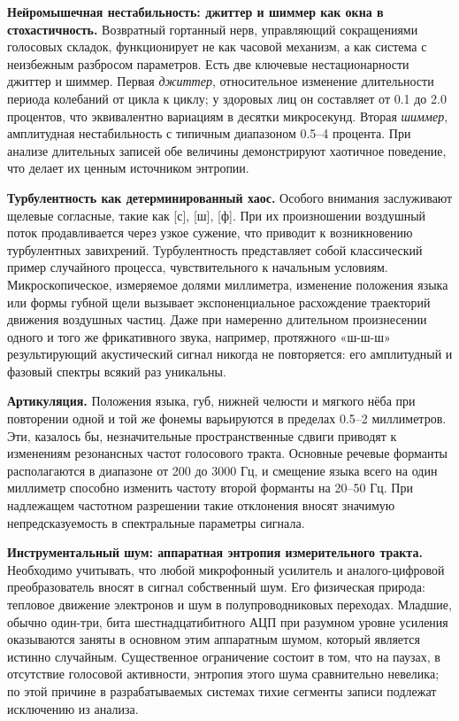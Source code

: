 \documentclass[14pt, a4paper]{extreport}
\begin{document}
\textbf{Нейромышечная нестабильность: джиттер и шиммер как окна в стохастичность.} Возвратный гортанный нерв, управляющий сокращениями голосовых складок, функционирует не как часовой механизм, а как система с неизбежным разбросом параметров. Есть две ключевые нестационарности джиттер и шиммер. Первая \textit{джиттер}, относительное изменение длительности периода колебаний от цикла к циклу; у здоровых лиц он составляет от 0.1 до 2.0 процентов, что эквивалентно вариациям в десятки микросекунд. Вторая \textit{шиммер}, амплитудная нестабильность с типичным диапазоном 0.5–4 процента. При анализе длительных записей обе величины демонстрируют хаотичное поведение, что делает их ценным источником энтропии.

\textbf{Турбулентность как детерминированный хаос.} Особого внимания заслуживают щелевые согласные, такие как [с], [ш], [ф]. При их произношении воздушный поток продавливается через узкое сужение, что приводит к возникновению турбулентных завихрений. Турбулентность представляет собой классический пример случайного процесса, чувствительного к начальным условиям. Микроскопическое, измеряемое долями миллиметра, изменение положения языка или формы губной щели вызывает экспоненциальное расхождение траекторий движения воздушных частиц. Даже при намеренно длительном произнесении одного и того же фрикативного звука, например, протяжного «ш-ш-ш» результирующий акустический сигнал никогда не повторяется: его амплитудный и фазовый спектры всякий раз уникальны.

\textbf{Артикуляция.} Положения языка, губ, нижней челюсти и мягкого нёба при повторении одной и той же фонемы варьируются в пределах 0.5–2 миллиметров. Эти, казалось бы, незначительные пространственные сдвиги приводят к изменениям резонансных частот голосового тракта. Основные речевые форманты располагаются в диапазоне от 200 до 3000 Гц, и смещение языка всего на один миллиметр способно изменить частоту второй форманты на 20–50 Гц. При надлежащем частотном разрешении такие отклонения вносят значимую непредсказуемость в спектральные параметры сигнала.

\textbf{Инструментальный шум: аппаратная энтропия измерительного тракта.} Необходимо учитывать, что любой микрофонный усилитель и аналого-цифровой преобразователь вносят в сигнал собственный шум. Его физическая природа: тепловое движение электронов и шум в полупроводниковых переходах. Младшие, обычно один-три, бита шестнадцатибитного АЦП при разумном уровне усиления оказываются заняты в основном этим аппаратным шумом, который является истинно случайным. Существенное ограничение состоит в том, что на паузах, в отсутствие голосовой активности, энтропия этого шума сравнительно невелика; по этой причине в разрабатываемых системах тихие сегменты записи подлежат исключению из анализа.
\end{document}

